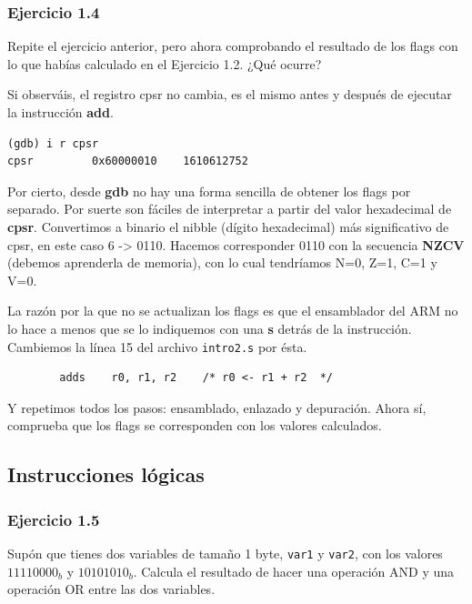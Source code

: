 \subsubsection{Ejercicio 1.4}

Repite el ejercicio anterior, pero ahora comprobando el resultado de los
flags con lo que habías calculado en el Ejercicio 1.2. ¿Qué ocurre?

Si observáis, el registro cpsr no cambia, es el mismo antes y después de
ejecutar la instrucción {\bf add}.

\begin{lstlisting}
(gdb) i r cpsr
cpsr         0x60000010    1610612752
\end{lstlisting}

Por cierto, desde {\bf gdb} no hay una forma sencilla de obtener los flags
por separado. Por suerte son fáciles de interpretar a partir del valor
hexadecimal de {\bf cpsr}. Convertimos a binario el nibble (dígito hexadecimal)
más significativo de cpsr, en este caso 6 -> 0110. Hacemos corresponder 0110
con la secuencia {\bf NZCV} (debemos aprenderla de memoria),
con lo cual tendríamos N=0, Z=1, C=1 y V=0.

La razón por la que no se actualizan los flags es que el ensamblador del ARM no
lo hace a menos que se lo indiquemos con una {\bf s} detrás de la instrucción.
Cambiemos la línea 15 del archivo {\tt intro2.s} por ésta.

\begin{lstlisting}
        adds    r0, r1, r2    /* r0 <- r1 + r2  */
\end{lstlisting}

Y repetimos todos los pasos: ensamblado, enlazado y depuración. Ahora sí, comprueba
que los flags se corresponden con los valores calculados.

\subsection{Instrucciones lógicas}


\subsubsection{Ejercicio 1.5}
Supón que tienes dos variables de tamaño 1 byte, {\tt var1} y {\tt var2}, con los valores
$11110000_b$ y $10101010_b$. Calcula el resultado de hacer una operación
AND y una operación OR entre las dos variables.

